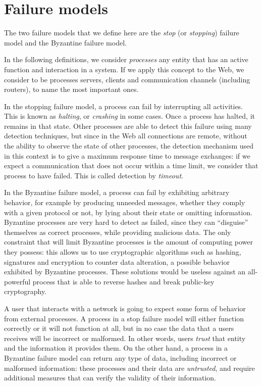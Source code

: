\documentclass[mscthesis]{usiinfthesis}
\begin{document}
\section{Failure models}

The two failure models that we define here are the \emph{stop} (or \emph{stopping}) failure model and the Byzantine failure model.

In the following definitions, we consider \emph{processes} any entity that has an active function and interaction in a system. If we apply this concept to the Web, we consider to be processes servers, clients and communication channels (including routers), to name the most important ones.

In the stopping failure model, a process can fail by interrupting all activities. This is known as \emph{halting}, or \emph{crashing} in some cases. Once a process has halted, it remains in that state. Other processes are able to detect this failure using many detection techniques, but since in the Web all connections are remote, without the ability to observe the state of other processes, the detection mechanism used in this context is to give a maximum response time to message exchanges: if we expect a communication that does not occur within a time limit, we consider that process to have failed. This is called detection by \textit{timeout}.

In the Byzantine failure model, a process can fail by exhibiting arbitrary behavior, for example by producing unneeded messages, whether they comply with a given protocol or not, by lying about their state or omitting information. Byzantine processes are very hard to detect as failed, since they can ``disguise'' themselves as correct processes, while providing malicious data. The only constraint that will limit Byzantine processes is the amount of computing power they possess: this allows us to use cryptographic algorithms such as hashing, signatures and encryption to counter data alteration, a possible behavior exhibited by Byzantine processes. These solutions would be useless against an all-powerful process that is able to reverse hashes and break public-key cryptography.

A user that interacts with a network is going to expect some form of behavior from external processes. A process in a stop failure model will either function correctly or it will not function at all, but in no case the data that a users receives will be incorrect or malformed. In other words, users \emph{trust} that entity and the information it provides them. On the other hand, a process in a Byzantine failure model can return any type of data, including incorrect or malformed information: these processes and their data are \emph{untrusted}, and require additional measures that can verify the validity of their information.
\end{document}

